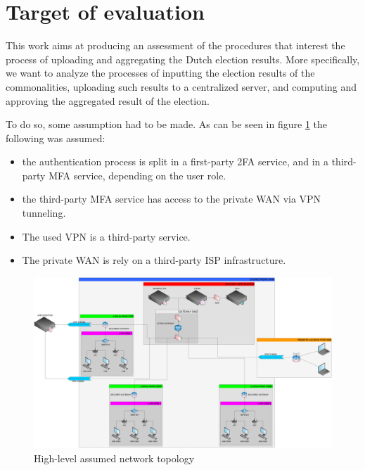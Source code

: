 \chapter*{Target of evaluation} 
\label{target_of_eval}

This work aims at producing an assessment of the procedures that interest the process of uploading and aggregating the Dutch election results. More specifically, we want to analyze the processes of inputting the election results of the commonalities, uploading such results to a centralized server, and computing and approving the aggregated result of the election.

To do so, some assumption had to be made. As can be seen in figure \ref{fig:map} the following was assumed:
\begin{itemize}
    \item the authentication process is split in a first-party 2FA service, and in a third-party MFA service, depending on the user role.
    \item the third-party MFA service has access to the private WAN via VPN tunneling.
    \item The used VPN is a third-party service.
    \item The private WAN is rely on a third-party ISP infrastructure.
\end{itemize}

\begin{figure}[h!]
    \centering
    \includegraphics[keepaspectratio,width=1\textwidth]{01-target/img/map.png}
    \caption{High-level assumed network topology}
    \label{fig:map}
\end{figure}